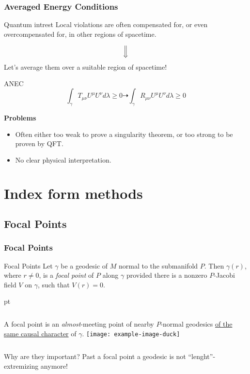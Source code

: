\documentclass[handout]{beamer}
\begin{document}
	\begin{frame}
		\frametitle{Averaged Energy Conditions}
		\begin{ideablock}{Quantum intrest}
			\centering
			Local violations are often compensated for, or even overcompensated for, in other regions of spacetime.
		\end{ideablock}
		\[
			\Big\Downarrow
		\]
		  Let's average them over a suitable region of spacetime!  
		\begin{defblock}{ANEC}
			\[
				\int_{\gamma} T_{\mu\nu}U^{\mu}U^{\nu} d\lambda \ge 0 \dashrightarrow \int_{\gamma}  R_{\mu\nu}U^{\mu}U^{\nu} d\lambda \ge 0
			\]
		\end{defblock}
		\textbf{Problems}
		\begin{itemize}
			\item Often either too weak to prove a singularity theorem, or too strong to be proven by QFT.
			\item No clear physical interpretation.
		\end{itemize}
	\end{frame}

	\section{Index form methods}
	\subsection{Focal Points}
	\begin{frame}
		\frametitle{Focal Points}
		\begin{defblock}{Focal Points}
			Let \(\gamma\) be a geodesic of \(M\) normal to the submanifold \(P\). Then \(\gamma(r)\), where \(r \neq 0\), is a \emph{focal point} of \(P\) along \(\gamma\) provided there is a nonzero \(P\)-Jacobi field \(V\) on \(\gamma\), such that \(V(r) = 0\).
		\end{defblock}
		\vskip 10 pt
		\begin{columns}
			\column{0.6\textwidth}
			A focal point is an \emph{almost}-meeting point of nearby \(P\)-normal geodesics \underline{of the same causal character} of \(\gamma\).
			\column{0.4\textwidth}
			\centering
			\texttt{[image: example-image-duck]}
		\end{columns}

		\begin{ideablock}{Why are they important?}
			\centering
			Past a focal point a geodesic is not ``lenght''-extremizing anymore!
		\end{ideablock}
	\end{frame}
\end{document}
